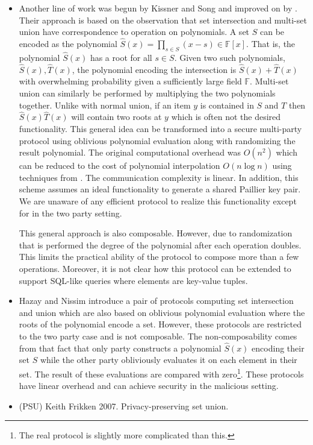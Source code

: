 \begin{itemize}
\item Another line of work was begun by Kissner and Song\cite{KS06} and improved on by \cite{MF06}. Their approach is based on the observation that set intersection and multi-set union have correspondence to operation on polynomials. A set $S$ can be encoded as the polynomial $\hat S(x)= \prod_{s\in S}(x-s)\in \mathbb{F}[x]$. That is, the polynomial $\hat S(x)$ has a root for all $s\in S$. Given two such polynomials, $\hat S(x), \hat T(x)$, the polynomial encoding the intersection is $\hat S(x)+\hat T(x)$ with overwhelming probability given a sufficiently large field $\mathbb{F}$. Multi-set union can similarly be performed by multiplying the two polynomials together. Unlike with normal union, if an item $y$ is contained in $S$ and $T$ then $\hat S(x)\hat T(x)$ will contain two roots at $y$ which is often not the desired functionality. This general idea can be transformed into a secure multi-party protocol using oblivious polynomial evaluation\cite{???} along with randomizing the result polynomial. The original computational overhead was $O(n^2)$ which can be reduced to the cost of polynomial interpolation $O(n\log n)$ using techniques from \cite{MF06}. The communication complexity is linear. In addition, this scheme assumes an ideal functionality to generate a shared Paillier key pair. We are unaware of any efficient protocol to realize this functionality except for \cite{RSA:HMRT12} in the two party setting.

This general approach is also composable. However, due to randomization that is performed the degree of the polynomial after each operation doubles. This limits the practical ability of the protocol to compose more than a few operations. Moreover, it is not clear how this protocol can be extended to support SQL-like queries where elements are key-value tuples.

\item Hazay and Nissim introduce a pair of protocols computing set intersection and union which are also based on oblivious polynomial evaluation where the roots of the polynomial encode a set. However, these protocols are restricted to the two party case and is not composable. The non-composability comes from that fact that only party constructs a polynomial $\hat S(x)$ encoding their set $S$ while the other party obliviously evaluates it on each element in their set. The result of these evaluations are compared with zero\footnote{The real protocol is slightly more complicated than this.}. These protocols have linear overhead and can achieve security in the malicious setting.

\item (PSU) Keith Frikken 2007. Privacy-preserving set union. 

\end{itemize}